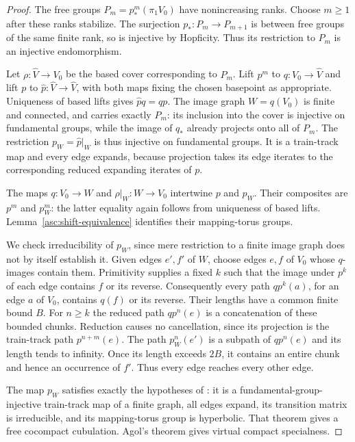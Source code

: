 \begin{proof}
The free groups $P_m=p_*^m(\pi_1V_0)$ have nonincreasing ranks. Choose
$m\ge1$ after these ranks stabilize. The surjection
$p_*:P_m\to P_{m+1}$ is between free groups of the same finite rank, so
is injective by Hopficity. Thus its restriction to $P_m$ is an injective
endomorphism.

Let $\rho:\widehat V\to V_0$ be the based cover corresponding to $P_m$.
Lift $p^m$ to $q:V_0\to\widehat V$ and lift $p$ to
$\widehat p:\widehat V\to\widehat V$, with both maps fixing the chosen
basepoint as appropriate. Uniqueness of based lifts gives
$\widehat p q=qp$. The image graph $W=q(V_0)$ is finite and connected,
and carries exactly $P_m$: its inclusion into the cover is injective
on fundamental groups, while the image of $q_*$ already projects onto
all of $P_m$. The restriction $p_W=\widehat p|_W$ is thus injective on
fundamental groups. It is a train-track map and every edge expands,
because projection takes its edge iterates to the corresponding reduced
expanding iterates of $p$.

The maps $q:V_0\to W$ and $\rho|_W:W\to V_0$ intertwine $p$ and $p_W$.
Their composites are $p^m$ and $p_W^m$: the latter equality again follows
from uniqueness of based lifts. Lemma~\ref{asc:shift-equivalence}
identifies their mapping-torus groups.

We check irreducibility of $p_W$, since mere restriction to a finite
image graph does not by itself establish it. Given edges $e',f'$ of
$W$, choose edges $e,f$ of $V_0$ whose $q$-images contain them.
Primitivity supplies a fixed $k$ such that the image under $p^k$ of each
edge contains $f$ or its reverse. Consequently every path
$q p^k(a)$, for an edge $a$ of $V_0$, contains $q(f)$ or its reverse.
Their lengths have a common finite bound $B$. For $n\ge k$ the reduced
path $q p^n(e)$ is a concatenation of these bounded chunks. Reduction
causes no cancellation, since its projection is the train-track path
$p^{n+m}(e)$. The path $p_W^n(e')$ is a subpath of $q p^n(e)$ and its
length tends to infinity. Once its length exceeds $2B$, it contains
an entire chunk and hence an occurrence of $f'$. Thus every edge
reaches every other edge.

The map $p_W$ satisfies exactly the hypotheses of
\cite[Theorem~B]{HagenWise2015}: it is a fundamental-group-injective
train-track map of a finite graph, all edges expand, its transition
matrix is irreducible, and its mapping-torus group is hyperbolic.
That theorem gives a free cocompact cubulation. Agol's theorem
\cite{Agol2013} gives virtual compact specialness.
\end{proof}


